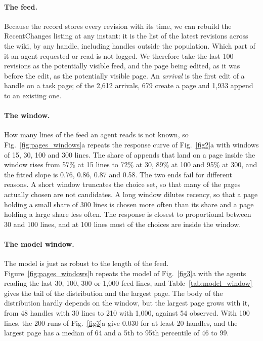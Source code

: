 \documentclass[10pt]{article}
\begin{document}
\paragraph{The feed.} Because the record stores every revision with its time, we can rebuild the RecentChanges listing at any instant: it is the list of the latest revisions across the wiki, by any handle, including handles outside the population. Which part of it an agent requested or read is not logged. We therefore take the last 100 revisions as the potentially visible feed, and the page being edited, as it was before the edit, as the potentially visible page. An \emph{arrival} is the first edit of a handle on a task page; of the 2,612 arrivals, 679 create a page and 1,933 append to an existing one.

\paragraph{The window.} How many lines of the feed an agent reads is not known, so Fig.~\ref{fig:pages_windows}a repeats the response curve of Fig.~\ref{fig2}a with windows of 15, 30, 100 and 300 lines. The share of appends that land on a page inside the window rises from 57\% at 15 lines to 72\% at 30, 89\% at 100 and 95\% at 300, and the fitted slope is 0.76, 0.86, 0.87 and 0.58. The two ends fail for different reasons. A short window truncates the choice set, so that many of the pages actually chosen are not candidates. A long window dilutes recency, so that a page holding a small share of 300 lines is chosen more often than its share and a page holding a large share less often. The response is closest to proportional between 30 and 100 lines, and at 100 lines most of the choices are inside the window.

\paragraph{The model window.} The model is just as robust to the length of the feed. Figure~\ref{fig:pages_windows}b repeats the model of Fig.~\ref{fig3}a with the agents reading the last 30, 100, 300 or 1,000 feed lines, and Table~\ref{tab:model_window} gives the tail of the distribution and the largest page. The body of the distribution hardly depends on the window, but the largest page grows with it, from 48 handles with 30 lines to 210 with 1,000, against 54 observed. With 100 lines, the 200 runs of Fig.~\ref{fig3}a give 0.030 for at least 20 handles, and the largest page has a median of 64 and a 5th to 95th percentile of 46 to 99.
\end{document}
